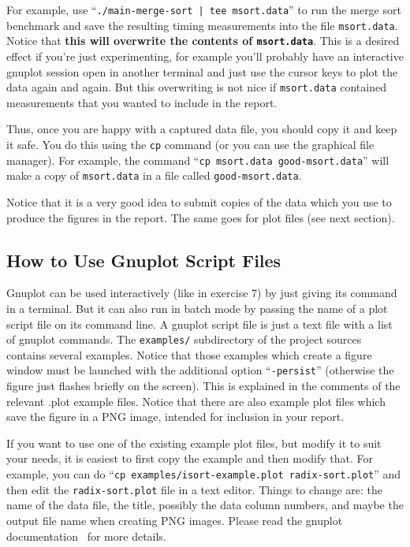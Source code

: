 \documentclass[a4paper,10pt]{article}
\begin{document}
For example, use ``\texttt{./main-merge-sort | tee msort.data}'' to run the merge sort benchmark and save the resulting timing measurements into the file \texttt{msort.data}.
Notice that \textbf{this will overwrite the contents of \texttt{msort.data}}.
This is a desired effect if you're just experimenting, for example you'll probably have an interactive gnuplot session open in another terminal and just use the cursor keys to plot the data again and again.
But this overwriting is not nice if \texttt{msort.data} contained measurements that you wanted to include in the report.

Thus, once you are happy with a captured data file, you should copy it and keep it safe.
You do this using the \texttt{cp} command (or you can use the graphical file manager).
For example, the command ``\texttt{cp msort.data good-msort.data}'' will make a copy of \texttt{msort.data} in a file called \texttt{good-msort.data}.

Notice that it is a very good idea to submit copies of the data which you use to produce the figures in the report.
The same goes for plot files (see next section).



\subsection*{How to Use Gnuplot Script Files}

Gnuplot can be used interactively (like in exercise 7) by just giving its command in a terminal.
But it can also run in batch mode by passing the name of a plot script file on its command line.
A gnuplot script file is just a text file with a list of gnuplot commands.
The \texttt{examples/} subdirectory of the project sources contains several examples.
Notice that those examples which create a figure window must be launched with the additional option ``\texttt{-persist}'' (otherwise the figure just flashes briefly on the screen).
This is explained in the comments of the relevant .plot example files.
Notice that there are also example plot files which save the figure in a PNG image, intended for inclusion in your report.

If you want to use one of the existing example plot files, but modify it to suit your needs, it is easiest to first copy the example and then modify that.
For example, you can do ``\texttt{cp examples/isort-example.plot radix-sort.plot}'' and then edit the \texttt{radix-sort.plot} file in a text editor.
Things to change are: the name of the data file, the title, possibly the data column numbers, and maybe the output file name when creating PNG images.
Please read the gnuplot documentation~\cite{gnuplot} for more details.
\end{document}
